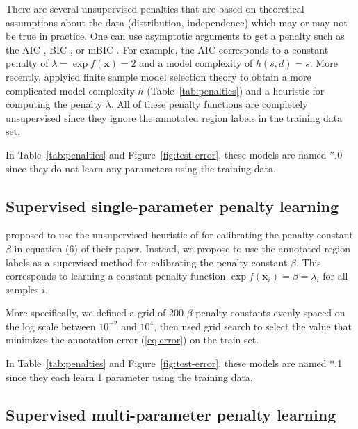 \documentclass{article}
\begin{document}

There are several unsupervised penalties that are based on theoretical
assumptions about the data (distribution, independence) which may or
may not be true in practice. One can use asymptotic arguments to get a
penalty such as the AIC \citep{Akaike73}, BIC \citep{Schwarz78}, or
mBIC \citep{mBIC}. For example, the AIC corresponds to a constant
penalty of $\lambda=\exp f(\mathbf x)=2$ and a model complexity of
$h(s, d)=s$. More recently, \citet{cleynen2013segmentation} applyied
finite sample model selection theory to obtain a more complicated
model complexity $h$ (Table~\ref{tab:penalties}) and a heuristic for
computing the penalty $\lambda$. All of these penalty functions are
completely unsupervised since they ignore the annotated region labels
in the training data set.

In Table~\ref{tab:penalties} and Figure~\ref{fig:test-error}, these
models are named *.0 since they do not learn any parameters using the
training data.

\subsection{Supervised single-parameter penalty learning}
\label{sec:supervised-single}

\citet{cleynen2013segmentation} proposed to use the un\-supervised
heuristic of \citet{Lav05} for calibrating the penalty constant
$\beta$ in equation (6) of their paper. Instead, we propose to use the
annotated region labels as a super\-vised method for calibrating the
penalty constant $\beta$. This corresponds to learning a constant
penalty function $\exp f(\mathbf x_i) = \beta = \lambda_i$ for all
samples $i$.

More specifically, we defined a grid of 200 $\beta$ penalty constants
evenly spaced on the log scale between $10^{-2}$ and $10^4$, then used
grid search to select the value that minimizes the annotation error
(\ref{eq:error}) on the train set.

In Table~\ref{tab:penalties} and Figure~\ref{fig:test-error}, these
models are named *.1 since they each learn 1 parameter using the
training data.

\subsection{Supervised multi-parameter penalty learning}
\label{sec:supervised-multi}
\end{document}
